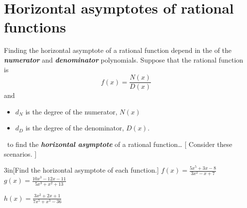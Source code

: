 \section{Horizontal asymptotes of rational functions}

Finding the horizontal asymptote of a rational function depend in the  
of the {\bfseries\itshape numerator} and {\bfseries\itshape denominator} polynomials.
Suppose that the rational function is 
\[ f(x) = \frac{N(x)}{D(x)} \]
and
\vspace{-0.5em}
\begin{itemize}[nosep]
    \item $d_N$ is the degree of the numerator, $N(x)$
    \item $d_D$ is the degree of the denominator, $D(x)$.
\end{itemize}
\vspace{1em}

\begin{myConceptSteps}{%
        ~to find the {\bfseries\itshape horizontal asymptote} of a rational function\dots
    }[%
        Consider these scenarios.
    ]
\end{myConceptSteps}

\begin{my2Problems}{3in}[Find the horizontal asymptote of each function.]
    {
        $f(x) = \frac{5x^5 + 3x -8}{3x^2-x+7}$
    }
    {
        $g(x) = \frac{10x^3 - 12x - 11}{5x^3 + x^2  + 13}$
    }
\end{my2Problems}
\begin{myProblem}{3in}
    {
        $h(x) = \frac{3x^2 + 2x + 1}{7x^5 + x^3-36}$
    }
\end{myProblem}
